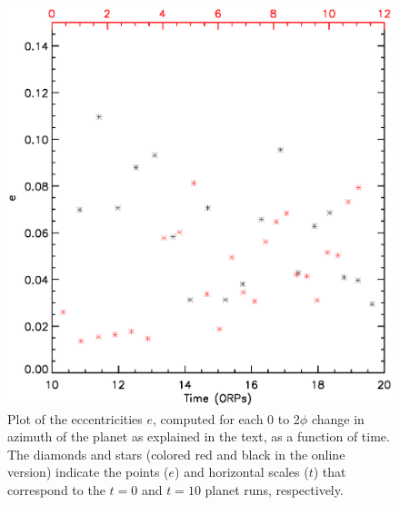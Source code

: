 \documentclass[12pt,manuscript,authoryear]{aastex}
\begin{document}
\begin{figure}[t]
\center
\includegraphics[width=12cm]{Figures/planete.eps}
\caption{Plot of the eccentricities $e$, computed for each 0 to 2$\phi$ change in azimuth of the planet as explained in the text, as a function of time. The diamonds and stars (colored red and black in the online version) indicate the points ($e$) and horizontal scales ($t$) that correspond to the $t = 0$ and $t = 10$ planet runs, respectively.}
\label{fig:e}
\end{figure}


\label{lastpage}
\end{document}
